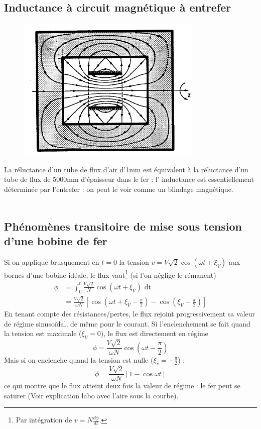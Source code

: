 	\subsection{Inductance à circuit magnétique à entrefer}
		\begin{figure}
		\vspace{-5mm}
		\includegraphics[scale=0.273]{ch3/image7.png}
		\end{figure}
	La réluctance d'un tube de flux d'air d'1mm est équivalent à la 
	réluctance d'un tube de flux de 5000mm d'épaisseur dans le fer : l'
	inductance est essentiellement déterminée par l'entrefer : on peut le 
	voir comme un blindage magnétique.\\\\
	
	
	\subsection{Phénomènes transitoire de mise sous tension d'une bobine 
	de fer}
	Si on applique brusquement en $t=0$ la tension $v=V\sqrt{2}\cos(\omega 
	t+\xi_V)$ aux bornes d'une bobine idéale, le flux vaut\footnote{Par 
	intégration de $v = N\frac{d\phi}{dt}$.} (si l'on néglige le rémanent)
	\begin{equation}
	\begin{array}{ll}
	\phi &= \int_0^t \frac{V\sqrt{2}}{N}\cos(\omega t + \xi_V)\text{ dt}\\
	 &= \frac{V\sqrt{2}}{\omega N}\left[\cos(\omega t + \xi_V - \frac{\pi}{2})
	 -\cos(\xi_V-\frac{\pi}{2})\right]
	\end{array}	
	\end{equation}
	En tenant compte des résistances/pertes, le flux rejoint progressivement 
	sa valeur de régime sinusoïdal, de même pour le courant. Si l'enclenchement 
	se fait quand la tension est maximale ($\xi_V=0$), le flux est directement 
	en régime
	\begin{equation}
	\phi = \frac{V\sqrt{2}}{\omega N}\cos\left(\omega t - \frac{\pi}{2}\right)
	\end{equation}	
	Mais si on enclenche quand la tension est nulle ($\xi_v = -\frac{\pi}{2}$) :
	\begin{equation}
	\phi = \frac{V\sqrt{2}}{\omega N}[1-\cos\omega t]
	\end{equation}
	ce qui montre que le flux atteint deux fois la valeur de régime : le fer 
	peut se saturer (Voir explication labo avec l'aire sous la courbe).

